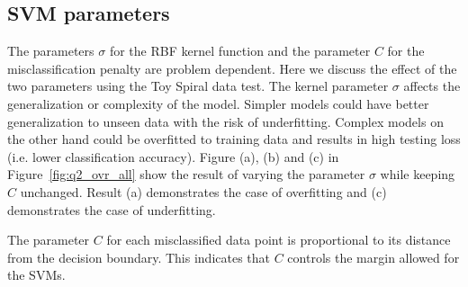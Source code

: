 \documentclass[10pt,twocolumn,letterpaper]{article}
\begin{document}
\subsection{SVM parameters}
The parameters $\sigma$ for the RBF kernel function and the parameter $C$ for the misclassification penalty are problem dependent. Here we discuss the effect of the two parameters using the Toy Spiral data test. The kernel parameter $\sigma$ affects the generalization or complexity of the model. Simpler models could have better generalization to unseen data with the risk of underfitting. Complex models on the other hand could be overfitted to training data and results in high testing loss (i.e. lower classification accuracy). Figure (a), (b) and (c) in Figure~\ref{fig:q2_ovr_all} show the result of varying the parameter $\sigma$ while keeping $C$ unchanged. Result (a) demonstrates the case of overfitting and (c) demonstrates the case of underfitting.

The parameter $C$ for each misclassified data point is proportional to its distance from the decision boundary. This indicates that $C$ controls the margin allowed for the SVMs. 
\end{document}
